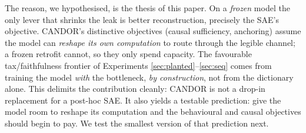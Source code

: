 \documentclass[11pt]{article}
\begin{document}
The reason, we hypothesised, is the thesis of this paper. On a \emph{frozen} model the
only lever
that shrinks the leak is better reconstruction, precisely the SAE's objective. CANDOR's
distinctive objectives (causal sufficiency, anchoring) assume the model can \emph{reshape
its own computation} to route through the legible channel; a frozen retrofit cannot, so they
only spend capacity. The favourable tax/faithfulness frontier of Experiments
\ref{sec:planted}--\ref{sec:seq} comes from training the model \emph{with} the bottleneck,
\emph{by construction}, not from the dictionary alone. This delimits the contribution
cleanly: CANDOR is not a drop-in replacement for a post-hoc SAE. It also yields a
testable prediction: give the model room to reshape its computation and the behavioural
and causal objectives should begin to pay. We test the smallest version of that
prediction next.
\end{document}
